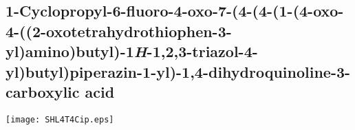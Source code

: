 \subsection{1\hyp{}Cyclopropyl\hyp{}6\hyp{}fluoro\hyp{}4\hyp{}oxo\hyp{}7\hyp{}(4\hyp{}(4\hyp{}(1\hyp{}(4\hyp{}oxo\hyp{}4\hyp{}((2\hyp{}oxotetrahydrothiophen\hyp{}3\hyp{}yl)amino)butyl)\hyp{}1\textit{H}\hyp{}1,2,3\hyp{}triazol\hyp{}4\hyp{}yl)butyl)piperazin\hyp{}1\hyp{}yl)\hyp{}1,4\hyp{}dihydroquin\allowbreak o\allowbreak l\allowbreak ine\hyp{}3\hyp{}carboxylic acid }


\begin{scheme}[H]
	\begin{center}
		\texttt{[image: SHL4T4Cip.eps]}
	\end{center}
\end{scheme}

